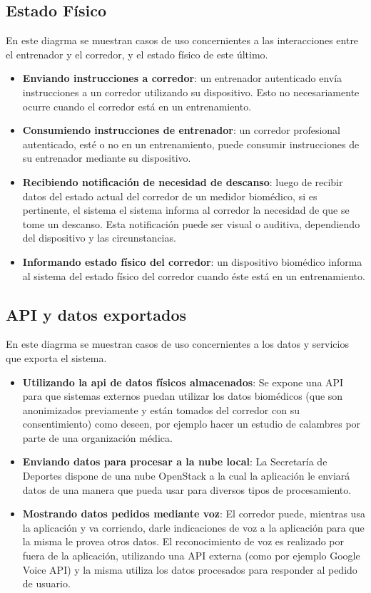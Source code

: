 \subsection{Estado Físico}
En este diagrma se muestran casos de uso concernientes a las interacciones entre el entrenador y el corredor, y el estado físico de este último.


\begin{itemize}
	\item \textbf{Enviando instrucciones a corredor}: un entrenador autenticado envía instrucciones a un corredor utilizando su dispositivo. Esto no necesariamente ocurre cuando el corredor está en un entrenamiento.
	\item \textbf{Consumiendo instrucciones de entrenador}: un corredor profesional autenticado, esté o no en un entrenamiento, puede consumir instrucciones de su entrenador mediante su dispositivo. 
	\item \textbf{Recibiendo notificación de necesidad de descanso}: luego de recibir datos del estado actual del corredor de un medidor biomédico, si es pertinente, el sistema el sistema informa al corredor la necesidad de que se tome un descanso. Esta notificación puede ser visual o auditiva, dependiendo del dispositivo y las circunstancias.
	\item \textbf{Informando estado físico del corredor}: un dispositivo biomédico informa al sistema del estado físico del corredor cuando éste está en un entrenamiento.
\end{itemize}


\subsection{API y datos exportados}
En este diagrma se muestran casos de uso concernientes a los datos y servicios que exporta el sistema.


\begin{itemize}
	\item \textbf{Utilizando la api de datos físicos almacenados}: Se expone una API para que sistemas externos puedan utilizar los datos biomédicos (que son anonimizados previamente y están tomados del corredor con su consentimiento) como deseen, por ejemplo hacer un estudio de calambres por parte de una organización médica. 
	\item \textbf{Enviando datos para procesar a la nube local}: La Secretaría de Deportes dispone de una nube OpenStack a la cual la aplicación le enviará datos de una manera que pueda usar para diversos tipos de procesamiento. 
	\item \textbf{Mostrando datos pedidos mediante voz}: El corredor puede, mientras usa la aplicación y va corriendo, darle indicaciones de voz a la aplicación para que la misma le provea otros datos. El reconocimiento de voz es realizado por fuera de la aplicación, utilizando una API externa (como por ejemplo Google Voice API) y la misma utiliza los datos procesados para responder al pedido de usuario.
\end{itemize}


